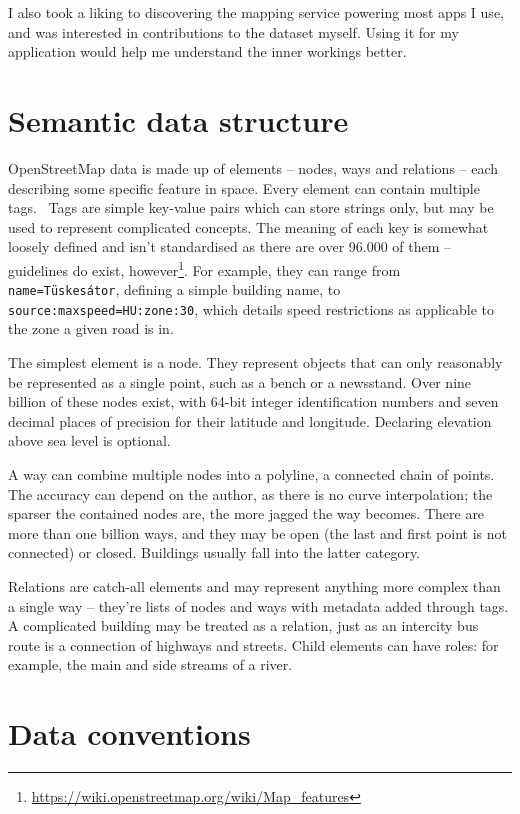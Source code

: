 I also took a liking to discovering the mapping service powering most apps I use, and was interested in contributions to the dataset myself. Using it for my application would help me understand the inner workings better.

\section{Semantic data structure}

OpenStreetMap data is made up of elements -- nodes, ways and relations -- each describing some specific feature in space. Every element can contain multiple tags.~\cite{osmElements} Tags are simple key-value pairs which can store strings only, but may be used to represent complicated concepts. The meaning of each key is somewhat loosely defined and isn't standardised as there are over 96.000 of them -- guidelines do exist, however\footnote{\url{https://wiki.openstreetmap.org/wiki/Map_features}}. For example, they can range from \verb|name=Tüskesátor|, defining a simple building name, to \verb|source:maxspeed=HU:zone:30|, which details speed restrictions as applicable to the zone a given road is in.

The simplest element is a node. They represent objects that can only reasonably be represented as a single point, such as a bench or a newsstand. Over nine billion of these nodes exist, with 64-bit integer identification numbers and seven decimal places of precision for their latitude and longitude. Declaring elevation above sea level is optional.

A way can combine multiple nodes into a polyline, a connected chain of points. The accuracy can depend on the author, as there is no curve interpolation; the sparser the contained nodes are, the more jagged the way becomes. There are more than one billion ways, and they may be open (the last and first point is not connected) or closed. Buildings usually fall into the latter category.

Relations are catch-all elements and may represent anything more complex than a single way -- they're lists of nodes and ways with metadata added through tags. A complicated building may be treated as a relation, just as an intercity bus route is a connection of highways and streets. Child elements can have roles: for example, the main and side streams of a river.

\section{Data conventions}

